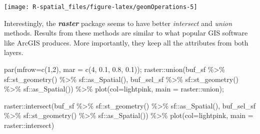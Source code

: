 \documentclass[
  11pt,
]{book}
\newenvironment{Shaded}{\begin{snugshade}}{\end{snugshade}}
\newcommand{\AttributeTok}[1]{\textcolor[rgb]{0.77,0.63,0.00}{#1}}
\newcommand{\DecValTok}[1]{\textcolor[rgb]{0.00,0.00,0.81}{#1}}
\newcommand{\FloatTok}[1]{\textcolor[rgb]{0.00,0.00,0.81}{#1}}
\newcommand{\FunctionTok}[1]{\textcolor[rgb]{0.00,0.00,0.00}{#1}}
\newcommand{\NormalTok}[1]{#1}
\newcommand{\SpecialCharTok}[1]{\textcolor[rgb]{0.00,0.00,0.00}{#1}}
\newcommand{\StringTok}[1]{\textcolor[rgb]{0.31,0.60,0.02}{#1}}
\begin{document}
\texttt{[image: R-spatial\_files/figure-latex/geomOperations-5]}

Interestingly, the \textbf{\emph{raster}} package seems to have better \emph{intersect} and \emph{union} methods. Results from these methods are similar to what popular GIS software like ArcGIS produces. More importantly, they keep all the attributes from both layers.

\begin{Shaded}
\begin{Highlighting}[]
\FunctionTok{par}\NormalTok{(}\AttributeTok{mfrow=}\FunctionTok{c}\NormalTok{(}\DecValTok{1}\NormalTok{,}\DecValTok{2}\NormalTok{), }\AttributeTok{mar =} \FunctionTok{c}\NormalTok{(}\DecValTok{4}\NormalTok{, }\FloatTok{0.1}\NormalTok{, }\FloatTok{0.8}\NormalTok{, }\FloatTok{0.1}\NormalTok{));}
\NormalTok{raster}\SpecialCharTok{::}\FunctionTok{union}\NormalTok{(buf\_sf }\SpecialCharTok{\%\textgreater{}\%}\NormalTok{ sf}\SpecialCharTok{::}\FunctionTok{st\_geometry}\NormalTok{() }\SpecialCharTok{\%\textgreater{}\%}\NormalTok{ sf}\SpecialCharTok{::}\FunctionTok{as\_Spatial}\NormalTok{(),}
\NormalTok{              buf\_sel\_sf }\SpecialCharTok{\%\textgreater{}\%}\NormalTok{ sf}\SpecialCharTok{::}\FunctionTok{st\_geometry}\NormalTok{() }\SpecialCharTok{\%\textgreater{}\%}\NormalTok{ sf}\SpecialCharTok{::}\FunctionTok{as\_Spatial}\NormalTok{()) }\SpecialCharTok{\%\textgreater{}\%} 
  \FunctionTok{plot}\NormalTok{(}\AttributeTok{col=}\StringTok{\textquotesingle{}lightpink\textquotesingle{}}\NormalTok{, }\AttributeTok{main =} \StringTok{\textquotesingle{}raster::union\textquotesingle{}}\NormalTok{);}

\NormalTok{raster}\SpecialCharTok{::}\FunctionTok{intersect}\NormalTok{(buf\_sf }\SpecialCharTok{\%\textgreater{}\%}\NormalTok{ sf}\SpecialCharTok{::}\FunctionTok{st\_geometry}\NormalTok{() }\SpecialCharTok{\%\textgreater{}\%}\NormalTok{ sf}\SpecialCharTok{::}\FunctionTok{as\_Spatial}\NormalTok{(), }
\NormalTok{                  buf\_sel\_sf }\SpecialCharTok{\%\textgreater{}\%}\NormalTok{ sf}\SpecialCharTok{::}\FunctionTok{st\_geometry}\NormalTok{() }\SpecialCharTok{\%\textgreater{}\%}\NormalTok{ sf}\SpecialCharTok{::}\FunctionTok{as\_Spatial}\NormalTok{()) }\SpecialCharTok{\%\textgreater{}\%} 
  \FunctionTok{plot}\NormalTok{(}\AttributeTok{col=}\StringTok{\textquotesingle{}lightpink\textquotesingle{}}\NormalTok{, }\AttributeTok{main =} \StringTok{\textquotesingle{}raster::intersect\textquotesingle{}}\NormalTok{)}
\end{Highlighting}
\end{Shaded}
\end{document}
